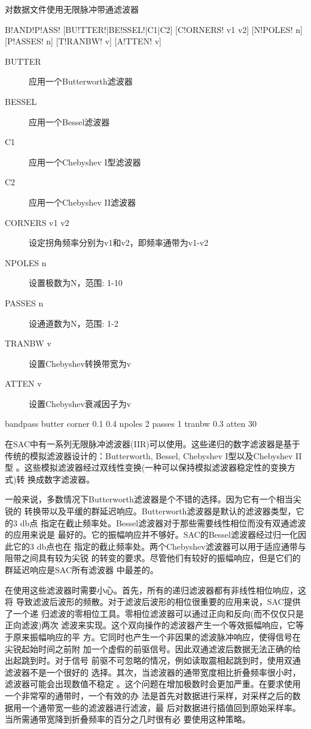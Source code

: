 \label{cmd:bandpass}

对数据文件使用无限脉冲带通滤波器

\begin{SACSTX}
B!AND!P!ASS! [BU!TTER!|BE!SSEL!|C1|C2] [C!ORNERS! v1 v2] [N!POLES! n] [P!ASSES! n]
    [T!RANBW! v] [A!TTEN! v]
\end{SACSTX}

\begin{description}
\item [BUTTER] 应用一个Butterworth滤波器
\item [BESSEL] 应用一个Bessel滤波器
\item [C1] 应用一个Chebyshev I型滤波器
\item [C2] 应用一个Chebyshev II滤波器
\item [CORNERS v1 v2] 设定拐角频率分别为v1和v2，即频率通带为v1-v2
\item [NPOLES n] 设置极数为N，范围: 1-10
\item [PASSES n] 设通道数为N，范围: 1-2
\item [TRANBW v] 设置Chebyshev转换带宽为v
\item [ATTEN v] 设置Chebyshev衰减因子为v
\end{description}

\begin{SACDFT}
bandpass butter corner 0.1 0.4 npoles 2 passes 1 tranbw 0.3 atten 30
\end{SACDFT}

在SAC中有一系列无限脉冲滤波器(IIR)可以使用。这些递归的数字滤波器是基于
传统的模拟滤波器设计的：Butterworth, Bessel, Chebyshev I型以及Chebyshev II型
。这些模拟滤波器经过双线性变换(一种可以保持模拟滤波器稳定性的变换方式)转
换成数字滤波器。

一般来说，多数情况下Butterworth滤波器是个不错的选择。因为它有一个相当尖锐的
转换带以及平缓的群延迟响应。Butterworth滤波器是默认的滤波器类型，它的3 db点
指定在截止频率处。Bessel滤波器对于那些需要线性相位而没有双通滤波的应用来说是
最好的。它的振幅响应并不够好。SAC的Bessel滤波器经过归一化因此它的3 db点也在
指定的截止频率处。两个Chebyshev滤波器可以用于适应通带与阻带之间具有较为尖锐
的转变的要求。尽管他们有较好的振幅响应，但是它们的群延迟响应是SAC所有滤波器
中最差的。

在使用这些滤波器时需要小心。首先，所有的递归滤波器都有非线性相位响应，这将
导致滤波后波形的频散。对于滤波后波形的相位很重要的应用来说，SAC提供了一个递
归滤波的零相位工具。零相位滤波器可以通过正向和反向(而不仅仅只是正向滤波)两次
滤波来实现。这个双向操作的滤波器产生一个等效振幅响应，它等于原来振幅响应的平
方。它同时也产生一个非因果的滤波脉冲响应，使得信号在尖锐起始时间之前附
加一个虚假的前驱信号。因此双通滤波后数据无法正确的给出起跳到时。对于信号
前驱不可忽略的情况，例如读取震相起跳到时，使用双通滤波器不是一个很好的
选择。其次，当滤波器的通带宽度相比折叠频率很小时，滤波器可能会出现数值不稳定
。这个问题在增加极数时会更加严重。在要求使用一个非常窄的通带时，一个有效的办
法是首先对数据进行采样，对采样之后的数据用一个通带宽一些的滤波器进行滤波，最
后对数据进行插值回到原始采样率。当所需通带宽降到折叠频率的百分之几时很有必
要使用这种策略。

